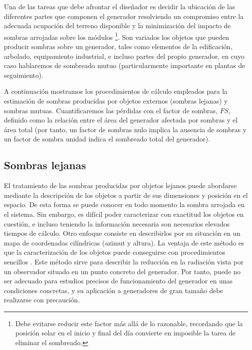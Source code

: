 Una de las tareas que debe afrontar el diseñador es decidir la ubicación
de las diferentes partes que componen el generador resolviendo un
compromiso entre la adecuada ocupación del terreno disponible y la
minimización del impacto de sombras arrojadas sobre los módulos%
\footnote{Debe evitarse reducir este factor más allá de lo razonable, recordando
que la posición solar en el inicio y final del día convierte en imposible
la tarea de eliminar el sombreado.%
}. Son variados los objetos que pueden producir sombras sobre un generador,
tales como elementos de la edificación, arbolado, equipamiento industrial,
e incluso partes del propio generador, en cuyo caso hablaremos de
sombreado mutuo (particularmente importante en plantas de seguimiento).

A continuación mostramos los procedimientos de cálculo empleados para
la estimación de sombras producidas por objetos externos (sombras
lejanas) y sombras mutuas. Cuantificaremos las pérdidas con el factor
de sombras, $FS$,
definido como la relación entre el área del generador afectada por
sombras y el área total (por tanto, un factor de sombras nulo implica
la ausencia de sombras y un factor de sombra unidad indica el sombreado
total del generador).


\subsection{Sombras lejanas\label{sub:Sombras-lejanas}}

El tratamiento de las sombras producidas por objetos lejanos puede
abordarse mediante la descripción de los objetos a partir de sus dimensiones
y posición en el espacio. De esta forma se puede conocer en todo momento
la sombra arrojada en el sistema. Sin embargo, es difícil poder caracterizar
con exactitud los objetos en cuestión, e incluso teniendo la información
necesaria son necesarios elevados tiempos de cálculo. Otro enfoque
consiste en describirlos por su situación en un mapa de coordenadas
cilíndricas (azimut y altura). La ventaja de este método es que la
caracterización de los objetos puede conseguirse con procedimientos
sencillos \cite{Caamano1998,Quaschning.Hanitsch1998}. Este método
sirve para describir la reducción en la radiación vista por un observador
situado en un punto concreto del generador. Por tanto, puede no ser
adecuado para estudios precisos de funcionamiento del generador en
unas condiciones concretas, y su aplicación a generadores de gran
tamaño debe realizarse con precaución. 

